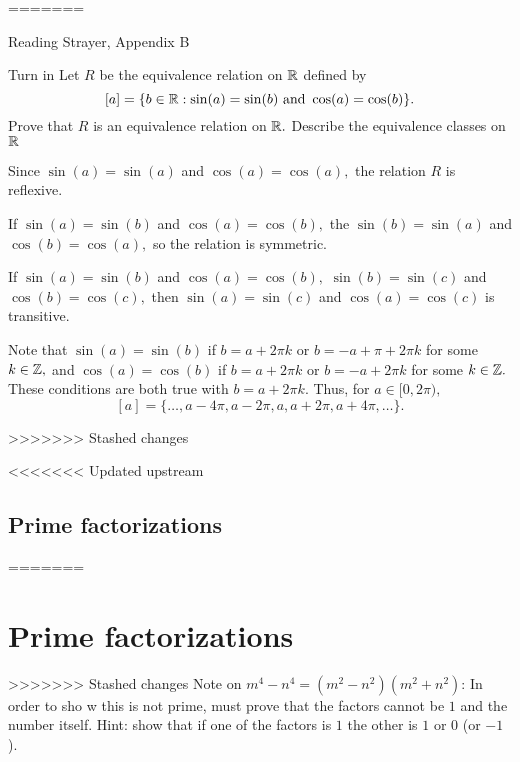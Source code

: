 \documentclass{ximera}
\begin{document}
=======
\begin{pre}
    \item[Reading] Strayer, Appendix B
    \item[Turn in] Let $R$ be the equivalence relation on $\mathbb R$
    defined by
    \[
   [a]=\{b\in\mathbb R:\sin(a)=\sin(b) \textnormal{ and }\cos(a)=\cos(b)\}.\]
     Prove that $R$ is an equivalence relation on $\mathbb R.$
   Describe the equivalence classes on $\mathbb R$
   
   \begin{solution}
        Since $\sin(a)=\sin(a)$ and $\cos(a)=\cos(a),$ the relation $R$ is reflexive.

        If $\sin(a)=\sin(b)$ and $\cos(a)=\cos(b),$ the $\sin(b)=\sin(a)$ and $\cos(b)=\cos(a),$ so the relation is symmetric.

        If $\sin(a)=\sin(b)$ and $\cos(a)=\cos(b),$ $\sin(b)=\sin(c)$ and $\cos(b)=\cos(c),$ then $\sin(a)=\sin(c)$ and $\cos(a)=\cos(c)$ is transitive.

        Note that $\sin(a)=\sin(b)$ if $b=a+2\pi k$ or $b=-a+\pi+2\pi k$ for some $k\in\mathbb Z,$ and  $\cos(a)=\cos(b)$ if $b=a+2\pi k$ or $b=-a+2\pi k$ for some $k\in\mathbb Z.$ These conditions are both true with $b=a+2\pi k$. Thus, for $a\in[0,2\pi),$
        \[
            [a]=\{\dots,a-4\pi,a-2\pi,a,a+2\pi,a+4\pi,\dots\}.
        \]
       \end{solution}
\end{pre}
>>>>>>> Stashed changes


<<<<<<< Updated upstream
\subsection{Prime factorizations}
=======
\section{Prime factorizations}
>>>>>>> Stashed changes
Note on $m^4-n^4=(m^2-n^2)(m^2+n^2)$: In order to sho w this is not prime, must prove that the factors cannot be $1$ and the number itself. Hint: show that if one of the factors is $1$ the other is $1$ or $0$ (or $-1$).
\end{document}
